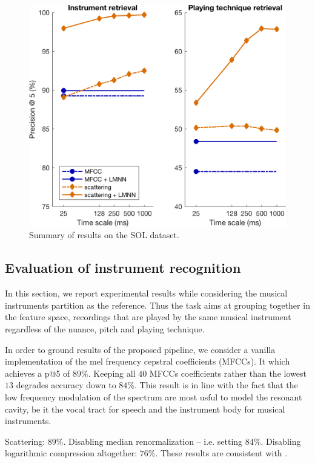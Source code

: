 \documentclass{article}
\makeatletter
\newcommand*{\ie}{i.e.\@\xspace}
\makeatother
\begin{document}
\begin{figure}
\includegraphics[width=\linewidth,keepaspectratio]{./figs/results/results.png}
\caption{Summary of results on the SOL dataset.}
\label{fig:results}
\end{figure}

\subsection{Evaluation of instrument recognition}

In this section, we report experimental results while considering the musical instruments partition as the reference. Thus the task aims at grouping together in the feature space, recordings that are played by the same musical instrument regardless of the nuance, pitch and playing technique.

In order to ground results of the proposed pipeline, we consider a vanilla implementation of the mel frequency cepstral coefficients (MFCCs). It which achieves a p@5 of $89\%$. Keeping all $40$ MFCCs coefficients rather than the lowest $13$ degrades accuracy down to $84\%$. This result is in line with the fact that the low frequency modulation of the spectrum are most usful to model the resonant cavity, be it the vocal tract for speech and the instrument body for musical instruments.

Scattering: $89\%$.
Disabling median renormalization -- \ie{} setting  $84\%$.
Disabling logarithmic compression altogether: $76\%$.
These results are consistent with \cite{lostanlen2018eurasip}.
\end{document}
